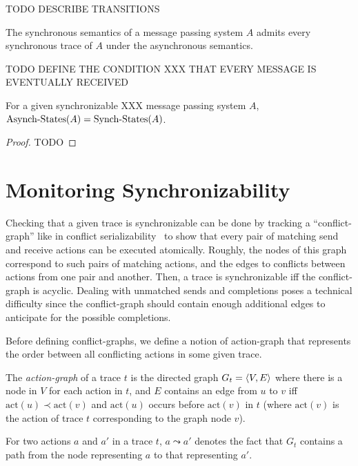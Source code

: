 TODO DESCRIBE TRANSITIONS 

\begin{lemma}\label{lem:sync_traces}
The synchronous semantics of a message passing system $A$ admits every synchronous trace of $A$ under the asynchronous semantics.
\end{lemma}

TODO DEFINE THE CONDITION XXX THAT EVERY MESSAGE IS EVENTUALLY RECEIVED

\begin{lemma}
For a given synchronizable XXX message passing system $A$, $\mathrm{Asynch}\text{-}\mathrm{States}(A)=\mathrm{Synch}\text{-}\mathrm{States}(A)$.
\end{lemma}
\begin{proof}
TODO 
\end{proof}

\section{Monitoring Synchronizability}\label{sec:monitoring}

Checking that a given trace is synchronizable can be done by tracking a ``conflict-graph'' like in conflict serializability~\cite{}
to show that every pair of matching send and receive actions can be executed atomically. Roughly, the nodes of this graph
correspond to such pairs of matching actions, and the edges to conflicts between actions from one pair and another. 
Then, a trace is synchronizable if{f} the conflict-graph is acyclic. Dealing with unmatched sends and completions 
poses a technical difficulty since the conflict-graph should contain enough additional edges
to anticipate for the possible completions. 

Before defining conflict-graphs, we define a notion of action-graph that represents the order between all conflicting actions in some given trace.

\begin{definition}\label{def:pr_graphs}
    The \emph{action-graph} of a trace $t$ is the directed graph 
    $G_t = \left\langle {V,E} \right\rangle$ where there is a node in $V$ for each action in $t$, and $E$ 
    contains an edge from $u$ to $v$ iff $\mathrm{act}(u) \prec \mathrm{act}(v)$ and $\mathrm{act}(u)$ occurs before $\mathrm{act}(v)$ in $t$ (where $\mathrm{act}(v)$ is the action of trace $t$ corresponding to the graph node $v$).
\end{definition}
For two actions $a$ and $a'$ in a trace $t$, $a\leadsto a'$ denotes the fact that $G_t$ contains a path from the node representing $a$ to that representing $a'$.

